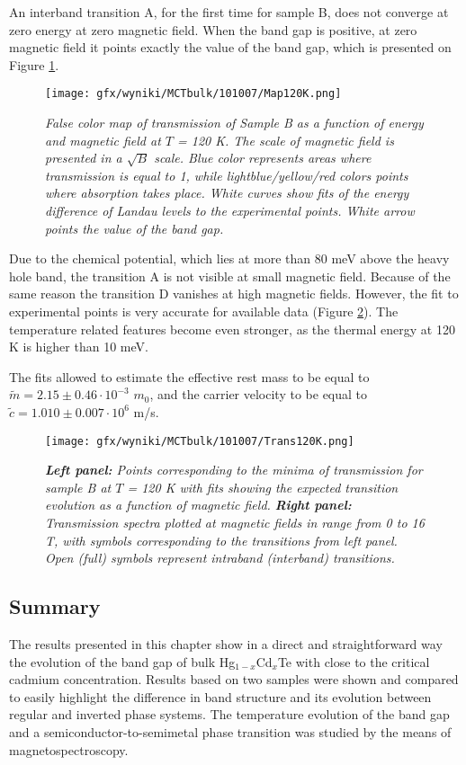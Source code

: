 \documentclass[titlepage,a4paper]{book}
\begin{document}
An interband transition A, for the first time for sample B, does not converge at zero energy at zero magnetic field. When the band gap is positive, at zero magnetic field it points exactly the value of the band gap, which is presented on Figure \ref{fig:Map_101007_120K}. 
\begin{figure}[ht]
	\centering
	\texttt{[image: gfx/wyniki/MCTbulk/101007/Map120K.png]}
	\vspace{-10pt}
	\caption{\textit{False color map of transmission of Sample B as a function of energy and magnetic field at $T$ = 120 K. The scale of magnetic field is presented in a $\sqrt{B}$ scale. Blue color represents areas where transmission is equal to 1, while lightblue/yellow/red colors points where absorption takes place. White curves show fits of the energy difference of Landau levels to the experimental points. White arrow points the value of the band gap.}}
	\label{fig:Map_101007_120K}
\end{figure} 
Due to the chemical potential, which lies at more than 80 meV above the heavy hole band, the transition A is not visible at small magnetic field. Because of the same reason the transition D vanishes at high magnetic fields. However, the fit to experimental points is very accurate for available data (Figure \ref{fig:Spectra_101007_120K}). The temperature related features become even stronger, as the thermal energy at 120 K is higher than 10 meV.

The fits allowed to estimate the effective rest mass to be equal to $\tilde m = 2.15 \pm 0.46 \cdot 10^{-3}$ $m_0$, and the carrier velocity to be equal to $\tilde{c} = 1.010 \pm 0.007 \cdot 10^6$ m/s.

\begin{figure}[ht]
	\centering
	\texttt{[image: gfx/wyniki/MCTbulk/101007/Trans120K.png]}
	\vspace{-10pt}
	\caption{\textit{\textbf{Left panel:} Points corresponding to the minima of transmission for sample B at $T$ = 120 K with fits showing the expected transition evolution as a function of magnetic field. \textbf{Right panel:} Transmission spectra plotted at magnetic fields in range from 0 to 16 T, with symbols corresponding to the transitions from left panel. Open (full) symbols represent intraband (interband) transitions.}}
	\label{fig:Spectra_101007_120K}
\end{figure}

\clearpage
\subsection{Summary}
The results presented in this chapter show in a direct and straightforward way the evolution of the band gap of bulk Hg$_{1-x}$Cd$_{x}$Te with close to the critical cadmium concentration. Results based on two samples were shown and compared to easily highlight the difference in band structure and its evolution between regular and inverted phase systems. The temperature evolution of the band gap and a semiconductor-to-semimetal phase transition was studied by the means of magnetospectroscopy. 
\end{document}
